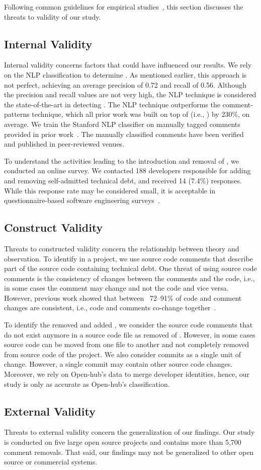 Following common guidelines for empirical studies~\cite{yin2013case},  this section discusses the threats to validity of our study.

\subsection{Internal Validity} Internal validity concerns factors that could
have influenced our results. We rely on the NLP classification to determine \SATD. As mentioned earlier, this approach is not perfect, achieving an average precision of 0.72 and recall of 0.56. Although the precision and recall values are not very high, the NLP technique is considered the state-of-the-art in detecting \SATD. The NLP technique outperforms the comment-patterns technique, which all prior work was built on top of (i.e., \cite{Wehaibi2016SANER,Bavota2016MSR,Potdar2014ICSME}) by 230\%, on average. We train the Stanford NLP classifier on manually tagged \SATD comments provided in prior work~\cite{Maldonado2015TSE}. The manually classified comments have been verified and published in peer-reviewed venues.

To understand the activities leading to the introduction and removal of \SATD, we conducted an online survey. 
We contacted 188 developers responsible for adding and removing self-admitted technical debt, and received 14 (7.4\%) responses.
While this response rate may be considered small, it is acceptable in questionnaire-based software engineering surveys~\cite{singer2008software}.

\subsection{Construct Validity} Threats to constructed validity concern the relationship between theory and observation.
To identify \SATD in a project, we use source code comments that describe part of the source code containing technical debt. One threat of using source code comments is the consistency of changes between the comments and the code, i.e., in some cases the comment may change and not the code and vice versa. However, previous work showed that between ~72--91\% of code and comment changes are consistent, i.e., code and comments co-change together~\cite{Potdar2014ICSME}. 


To identify the removed and added \SATD, we consider the source code comments that do not exist anymore in a source code file as removed of \SATD. However, in some cases source code can be moved from one file to another and not completely removed from source code of the project. We also consider commits as a single unit of change. However, a single commit may contain other source code changes. Moreover, we rely on Open-hub's data to merge developer identities, hence, our study is only as accurate as Open-hub's classification.

\subsection{External Validity} Threats to external validity concern the generalization of our findings. Our study is conducted on five large open source projects and contains more than 5,700 comment removals. That said, our findings may not be generalized to other open source or commercial systems.